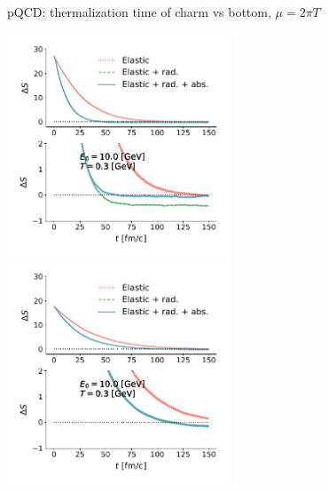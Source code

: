 \documentclass[11pt]{beamer}
\begin{document}
\begin{frame}{pQCD: thermalization time of charm vs bottom, $\mu = 2\pi T$}
\begin{center}
\includegraphics[width=0.5\textwidth]{fig/charm-plot/thermalization.pdf}
\includegraphics[width=0.5\textwidth]{fig/bottom-plot/thermalization.pdf}
\end{center}
\end{frame}
\end{document}
